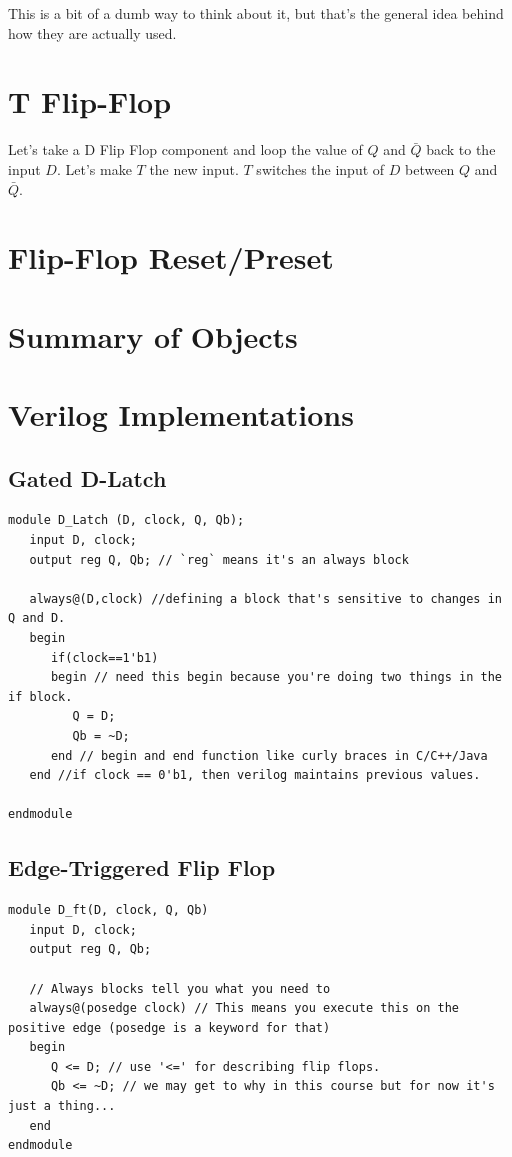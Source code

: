 \documentclass[a4paper,12pt]{report}
\begin{document}
This is a bit of a dumb way to think about it, but that's the general idea behind how 
they are actually used. 


\section{T Flip-Flop}
Let's take a D Flip Flop component and loop the value of $Q$ and $\bar{Q}$ back to the 
input $D$. Let's make $T$ the new input. $T$ switches the input of $D$ between $Q$ and 
$\bar{Q}$. 

\section{Flip-Flop Reset/Preset}

\section{Summary of Objects}

\section{Verilog Implementations}
\subsection{Gated D-Latch}
\begin{lstlisting}
module D_Latch (D, clock, Q, Qb);   
   input D, clock;
   output reg Q, Qb; // `reg` means it's an always block

   always@(D,clock) //defining a block that's sensitive to changes in Q and D.
   begin
      if(clock==1'b1)
      begin // need this begin because you're doing two things in the if block.
         Q = D;
         Qb = ~D;
      end // begin and end function like curly braces in C/C++/Java
   end //if clock == 0'b1, then verilog maintains previous values. 

endmodule
\end{lstlisting}

\subsection{Edge-Triggered Flip Flop}
\begin{lstlisting}
module D_ft(D, clock, Q, Qb)
   input D, clock;
   output reg Q, Qb;

   // Always blocks tell you what you need to 
   always@(posedge clock) // This means you execute this on the positive edge (posedge is a keyword for that)
   begin 
      Q <= D; // use '<=' for describing flip flops.
      Qb <= ~D; // we may get to why in this course but for now it's just a thing...
   end
endmodule
\end{lstlisting}
\end{document}
